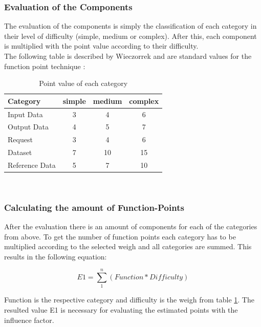 \subsubsection{Evaluation of the Components}

The evaluation of the components is simply the classification of each category in their level of difficulty (simple, medium or complex). After this, each component is multiplied with the point value according to their difficulty. \\
The following table is described by Wieczorrek and are standard values for the function point technique \cite{fpafundamentals}:\\
\begin{table}[h] 
	\centering 
	\setlength{\tabcolsep}{4pt}
	\begin{tabular}{|l||c|c|c|}\hline
		Category & simple & medium & complex \\ \hline\hline
		Input Data & 3 & 4 & 6\\ \hline
		Output Data & 4 & 5 & 7\\ \hline
		Request & 3 & 4 & 6\\ \hline
		Dataset & 7 & 10 & 15\\ \hline
		Reference Data & 5 & 7 & 10\\ \hline
	\end{tabular}
	\caption{Point value of each category} 
	\label{tab:pointvalues} 
\end{table} \\

\subsubsection{ Calculating the amount of Function-Points}

After the evaluation there is an amount of components for each of the categories from above. To get the number of function points each category has to be multiplied according to the selected weigh and all categories are summed. This results in the following equation:

\begin{equation}
	E1 =  \sum \limits_{1}^n  (Function * Difficulty) \label{fp:E1}
\end{equation}

Function is the respective category and difficulty is the weigh from table \ref{tab:pointvalues}. The resulted value E1 is necessary for evaluating the estimated points with the influence factor.

